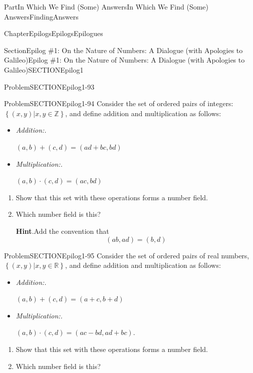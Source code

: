 \documentclass[oneside,10pt,]{book}
\newcommand{\blocktitlefont}{\relax}
\newcommand{\lititle}[1]{{\slshape#1}}
\numberwithin{equation}{part}
\newcommand{\RR}{\mathbb {R}}
\newcommand{\ZZ}{\mathbb {Z}}
\begin{document}
\begin{partptx}{Part}{In Which We Find (Some) Answers}{}{In Which We Find (Some) Answers}{}{}{FindingAnswers}
\begin{chapterptx}{Chapter}{Epilogs}{}{Epilogs}{}{}{Epilogues}
\begin{sectionptx}{Section}{Epilog \#1: On the Nature of Numbers: A Dialogue (with Apologies to Galileo)}{}{Epilog \#1: On the Nature of Numbers: A Dialogue (with Apologies to Galileo)}{}{}{SECTIONEpilog1}
\begin{problem}{Problem}{}{SECTIONEpilog1-93}
\end{problem}
\begin{problem}{Problem}{}{SECTIONEpilog1-94}%
Consider the set of ordered pairs of integers: \(\left\{(x,y)|x, y \in \ZZ\right\}\), and define addition and multiplication as follows:%
 \par
%
\begin{itemize}[label=\textbullet]
\item{}\lititle{Addition:.}\par%
\(\displaystyle (a,b)+(c,d) = (ad+bc, bd)\)%
\item{}\lititle{Multiplication:.}\par%
\(\displaystyle (a,b)\cdot(c,d) = (ac, bd)\)%
\end{itemize}
%
\begin{enumerate}[font=\bfseries,label=(\alph*),ref=\alph*]%
\item{}Show that this set with these operations forms a number field.%
\item{}Which number field is this?%
\par\smallskip%
\noindent\textbf{\blocktitlefont Hint}.\hypertarget{SECTIONEpilog1-94-4-2}{}\quad{}Add the convention that%
\begin{equation*}
(ab, ad) = (b,d)
\end{equation*}
%
\end{enumerate}%
\end{problem}
\begin{problem}{Problem}{}{SECTIONEpilog1-95}%
Consider the set of ordered pairs of real numbers, \(\left\{(x,y)|x, y\in\RR\right\}\), and define addition and multiplication as follows:%
 \par
%
\begin{itemize}[label=\textbullet]
\item{}\lititle{Addition:.}\par%
\(\displaystyle (a,b)+(c,d) = (a+c, b+d)\)%
\item{}\lititle{Multiplication:.}\par%
\((a,b)\cdot(c,d) = (ac- bd,ad+bc)\).%
\end{itemize}
%
\begin{enumerate}[font=\bfseries,label=(\alph*),ref=\alph*]%
\item{}Show that this set with these operations forms a number field.%
\item{}Which number field is this?%
\end{enumerate}%
\end{problem}
\end{sectionptx}

\end{chapterptx}
\end{partptx}
\end{document}
